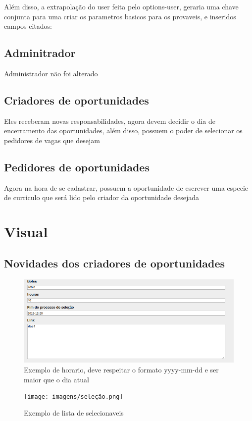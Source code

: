 \documentclass[12pt]{article}
\begin{document}
Além disso, a extrapolação do user feita pelo options-user, geraria uma chave conjunta para uma criar os parametros basicos
para os provaveis, e inseridos campos citados:

\subsection{Adminitrador}

Administrador não foi alterado

\subsection{Criadores de oportunidades}

Eles receberam novas responsabilidades, agora devem decidir o dia de encerramento das oportunidades, além disso,
possuem o poder de selecionar os pedidores de vagas que desejam

\subsection{Pedidores de oportunidades}

Agora na hora de se cadastrar, possuem a oportunidade de escrever uma especie de curriculo que será lido pelo criador
da oportunidade desejada


\section{Visual}\label{sec:figs}


\subsection{Novidades dos criadores de oportunidades }

\begin{figure}[ht]
\centering
\includegraphics[width=.5\textwidth]{imagens/horarios.png}
\caption{Exemplo de horario, deve respeitar o formato yyyy-mm-dd e ser maior que o dia atual}
\end{figure}

\begin{figure}[ht]
\centering
\texttt{[image: imagens/seleção.png]}
\caption{Exemplo de lista de selecionaveis}
\end{figure}
\end{document}
